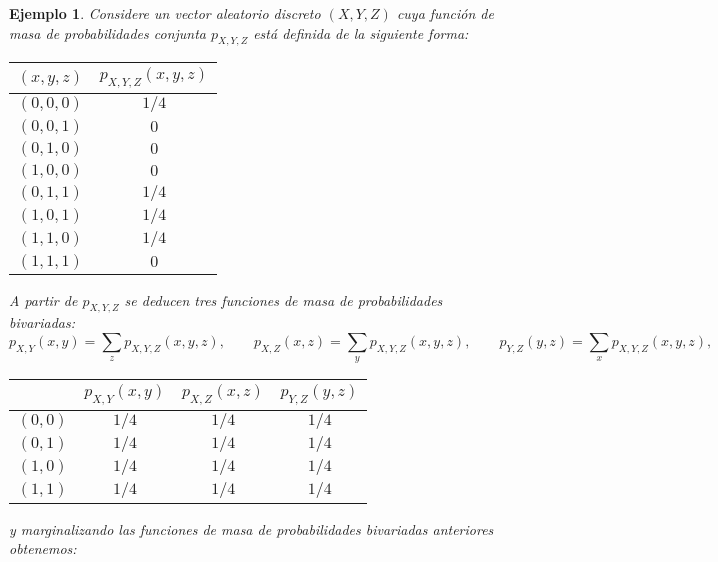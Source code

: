\documentclass[spanish,10pt,letterpaper]{article}
\newtheorem{ejem}{Ejemplo}
\begin{document}
\begin{ejem}\label{ej:BernoulliTri}
    Considere un vector aleatorio discreto $(X,Y,Z)$ cuya función de masa de probabilidades conjunta $p_{X,Y,Z}$ está definida de la siguiente forma:
    \begin{center}
        \begin{tabular}{|c|c|} \hline
		  $(x,y,z)$ & $p_{X,Y,Z}(x,y,z)$  \\ \hline\hline  
		  $(0,0,0)$ & $1/4$  \\
		  $(0,0,1)$ & $0$ \\ 
		  $(0,1,0)$ & $0$ \\ 
		  $(1,0,0)$ & $0$ \\
		  $(0,1,1)$ & $1/4$ \\
		  $(1,0,1)$ & $1/4$ \\
		  $(1,1,0)$ & $1/4$ \\
		  $(1,1,1)$ & $0$ \\ \hline 
        \end{tabular}
   \end{center}
   A partir de $p_{X,Y,Z}$ se deducen tres funciones de masa de probabilidades bivariadas: 
   $$p_{X,Y}(x,y)=\sum_{z}p_{X,Y,Z}(x,y,z),\qquad p_{X,Z}(x,z)=\sum_{y}p_{X,Y,Z}(x,y,z),\qquad p_{Y,Z}(y,z)=\sum_{x}p_{X,Y,Z}(x,y,z),$$
   
   \begin{center}
        \begin{tabular}{|c|c|c|c|} \hline
            { } & $p_{X,Y}(x,y)$ & $p_{X,Z}(x,z)$ & $p_{Y,Z}(y,z)$ \\ \hline\hline
            $(0,0)$ & $1/4$ & $1/4$ & $1/4$ \\
            $(0,1)$ & $1/4$ & $1/4$ & $1/4$ \\
            $(1,0)$ & $1/4$ & $1/4$ & $1/4$ \\
            $(1,1)$ & $1/4$ & $1/4$ & $1/4$ \\ \hline
        \end{tabular}
   \end{center}
   y marginalizando las funciones de masa de probabilidades bivariadas anteriores obtenemos:


\end{ejem}
\end{document}
